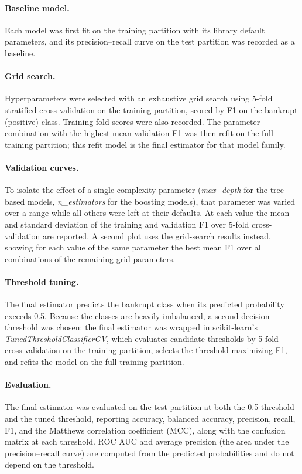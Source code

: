 \documentclass[11pt]{article}
\begin{document}
\paragraph{Baseline model.} Each model was first fit on the training
partition with its library default parameters, and its
precision--recall curve on the test partition was recorded as a
baseline.

\paragraph{Grid search.} Hyperparameters were selected with an
exhaustive grid search using 5-fold stratified cross-validation on the
training partition, scored by F1 on the bankrupt (positive) class.
Training-fold scores were also recorded. The parameter combination
with the highest mean validation F1 was then refit on the full
training partition; this refit model is the final estimator for that
model family.

\paragraph{Validation curves.} To isolate the effect of a single
complexity parameter (\textit{max\_depth} for the tree-based models,
\textit{n\_estimators} for the boosting models), that parameter was
varied over a range while all others were left at their defaults. At
each value the mean and standard deviation of the training and
validation F1 over 5-fold cross-validation are reported. A second plot
uses the grid-search results instead, showing for each value of the
same parameter the best mean F1 over all combinations of the remaining
grid parameters.

\paragraph{Threshold tuning.} The final estimator predicts the
bankrupt class when its predicted probability exceeds 0.5. Because the
classes are heavily imbalanced, a second decision threshold was
chosen: the final estimator was wrapped in scikit-learn's
\textit{TunedThresholdClassifierCV}, which evaluates candidate
thresholds by 5-fold cross-validation on the training partition,
selects the threshold maximizing F1, and refits the model on the full
training partition.

\paragraph{Evaluation.} The final estimator was evaluated on the test
partition at both the 0.5 threshold and the tuned threshold, reporting
accuracy, balanced accuracy, precision, recall, F1, and the Matthews
correlation coefficient (MCC), along with the confusion matrix at each
threshold. ROC AUC and average precision (the area under the
precision--recall curve) are computed from the predicted probabilities
and do not depend on the threshold.
\end{document}
